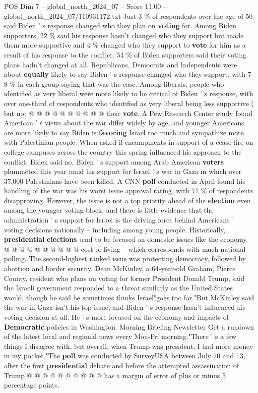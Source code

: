 \begin{textsample}{POS Dim 7 – global\_north\_2024\_07 – Score 11.00 – global\_north\_2024\_07/110931172.txt}
Just 3 \% of respondents over the age of 50 said Biden ' s response changed who they plan on \textbf{voting} for.
Among Biden supporters, 22 \% said his response hasn't changed who they support but made them more supportive and 4 \% changed who they support to \textbf{vote} for him as a result of his response to the conflict. 54 \% of Biden supporters said their voting plans hadn't changed at all.
Republicans, Democrats and Independents were about \textbf{equally} likely to say Biden ' s response changed who they support, with 7-8 \% in each group saying that was the case.
Among liberals, people who identified as very liberal were more likely to be critical of Biden ' s response, with over one-third of respondents who identified as very liberal being less supportive ( but not @ @ @ @ @ @ @ @ @ @ their \textbf{vote}.
A Pew Research Center study found American ' s views about the war differ widely by age, and younger Americans are more likely to say Biden is \textbf{favoring} Israel too much and sympathize more with Palestinian people.
When asked if encampments in support of a cease fire on college campuses across the country this spring influenced his approach to the conflict, Biden said no.
Biden ' s support among Arab American \textbf{voters} plummeted this year amid his support for Israel ' s war in Gaza in which over 37,000 Palestinians have been killed.
A CNN \textbf{poll} conducted in April found his handling of the war was his worst issue approval rating, with 71 \% of respondents disapproving.
However, the issue is not a top priority ahead of the \textbf{election} even among the younger voting block, and there is little evidence that the administration ' s support for Israel is the driving force behind Americans ' voting decisions nationally -- including among young people.
Historically, \textbf{presidential} \textbf{elections} tend to be focused on domestic issues like the economy. @ @ @ @ @ @ @ @ @ @ cost of living -- which corresponds with much national polling.
The second-highest ranked issue was protecting democracy, followed by abortion and border security.
Dean McKinley, a 64-year-old Graham, Pierce County, resident who plans on voting for former President Donald Trump, said the Israeli government responded to a threat similarly as the United States would, though he said he sometimes thinks Israel"goes too far."But McKinley said the war in Gaza isn't his top issue, and Biden ' s response hasn't influenced his voting decision at all.
He ' s more focused on the economy and impacts of \textbf{Democratic} policies in Washington.
Morning Briefing Newsletter Get a rundown of the latest local and regional news every Mon-Fri morning."There ' s a few things I disagree with, but overall, when Trump was president, I had more money in my pocket."The \textbf{poll} was conducted by SurveyUSA between July 10 and 13, after the first \textbf{presidential} debate and before the attempted assassination of Trump @ @ @ @ @ @ @ @ @ @ has a margin of error of plus or minus 5 percentage points.

\end{textsample}
